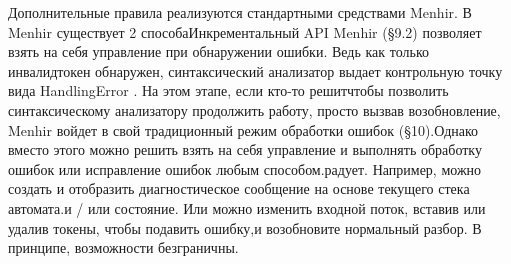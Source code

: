 Дополнительные правила реализуются стандартными средствами Menhir. В Menhir существует 2 способаИнкрементальный API Menhir (§9.2) позволяет взять на себя управление при обнаружении ошибки. Ведь как только инвалидтокен обнаружен, синтаксический анализатор выдает контрольную точку вида HandlingError . На этом этапе, если кто-то решитчтобы позволить синтаксическому анализатору продолжить работу, просто вызвав возобновление, Menhir войдет в свой традиционный режим обработки ошибок (§10).Однако вместо этого можно решить взять на себя управление и выполнять обработку ошибок или исправление ошибок любым способом.радует. Например, можно создать и отобразить диагностическое сообщение на основе текущего стека автомата.и / или состояние. Или можно изменить входной поток, вставив или удалив токены, чтобы подавить ошибку,и возобновите нормальный разбор. В принципе, возможности безграничны.